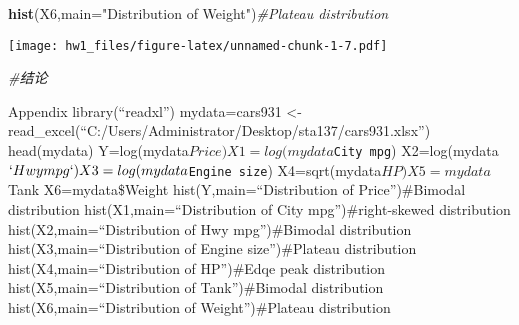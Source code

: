 \documentclass[
]{article}
\newenvironment{Shaded}{\begin{snugshade}}{\end{snugshade}}
\newcommand{\CommentTok}[1]{\textcolor[rgb]{0.56,0.35,0.01}{\textit{#1}}}
\newcommand{\DataTypeTok}[1]{\textcolor[rgb]{0.13,0.29,0.53}{#1}}
\newcommand{\KeywordTok}[1]{\textcolor[rgb]{0.13,0.29,0.53}{\textbf{#1}}}
\newcommand{\NormalTok}[1]{#1}
\newcommand{\StringTok}[1]{\textcolor[rgb]{0.31,0.60,0.02}{#1}}
\begin{document}
\begin{Shaded}
\begin{Highlighting}[]
\KeywordTok{hist}\NormalTok{(X6,}\DataTypeTok{main=}\StringTok{"Distribution of Weight"}\NormalTok{)}\CommentTok{#Plateau distribution }
\end{Highlighting}
\end{Shaded}

\texttt{[image: hw1\_files/figure-latex/unnamed-chunk-1-7.pdf]}

\begin{Shaded}
\begin{Highlighting}[]
\CommentTok{#结论}
\end{Highlighting}
\end{Shaded}

Appendix library(``readxl'') mydata=cars931 \textless-
read\_excel(``C:/Users/Administrator/Desktop/sta137/cars931.xlsx'')
head(mydata) Y=log(mydata\(Price) X1=log(mydata\)\texttt{City\ mpg})
X2=log(mydata\(`Hwy mpg`) X3=log(mydata\)\texttt{Engine\ size})
X4=sqrt(mydata\(HP) X5=mydata\)Tank X6=mydata\$Weight
hist(Y,main=``Distribution of Price'')\#Bimodal distribution
hist(X1,main=``Distribution of City mpg'')\#right-skewed distribution
hist(X2,main=``Distribution of Hwy mpg'')\#Bimodal distribution
hist(X3,main=``Distribution of Engine size'')\#Plateau distribution\\
hist(X4,main=``Distribution of HP'')\#Edqe peak distribution
hist(X5,main=``Distribution of Tank'')\#Bimodal distribution
hist(X6,main=``Distribution of Weight'')\#Plateau distribution
\end{document}
